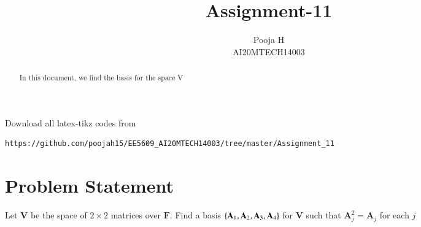 \documentclass[journal,12pt,twocolumn]{IEEEtran}
\begin{document}
\let\vec\mathbf
\renewcommand{\thefigure}{\theproblem}
\def\putbox#1#2#3{\makebox[0in][l]{\makebox[#1][l]{}\raisebox{\baselineskip}[0in][0in]{\raisebox{#2}[0in][0in]{#3}}}}
     \def\rightbox#1{\makebox[0in][r]{#1}}
     \def\centbox#1{\makebox[0in]{#1}}
     \def\topbox#1{\raisebox{-\baselineskip}[0in][0in]{#1}}
     \def\midbox#1{\raisebox{-0.5\baselineskip}[0in][0in]{#1}}
\vspace{3cm}
\title{Assignment-11}
\author{Pooja H \\ AI20MTECH14003}
\maketitle
\newpage
\bigskip
\renewcommand{\thefigure}{\theenumi}
\renewcommand{\thetable}{\theenumi}
\newenvironment{amatrix}[1]{%
	\left(\begin{array}{@{}*{#1}{c}|c@{}}
	}{%
	\end{array}\right)
}

\begin{abstract}
In this document, we find the basis for the space V
\end{abstract}
Download all latex-tikz codes from 
\begin{lstlisting}
https://github.com/poojah15/EE5609_AI20MTECH14003/tree/master/Assignment_11
\end{lstlisting}


\section{Problem Statement}
Let $\vec{V}$ be the space of $2\times2$ matrices over $\vec{F}$. Find a basis $\cbrak{\vec{A}_1, \vec{A}_2, \vec{A}_3, \vec{A}_4}$ for $\vec{V}$ such that $\vec{A}_j^2 = \vec{A}_j$ for each $j$
\end{document}
